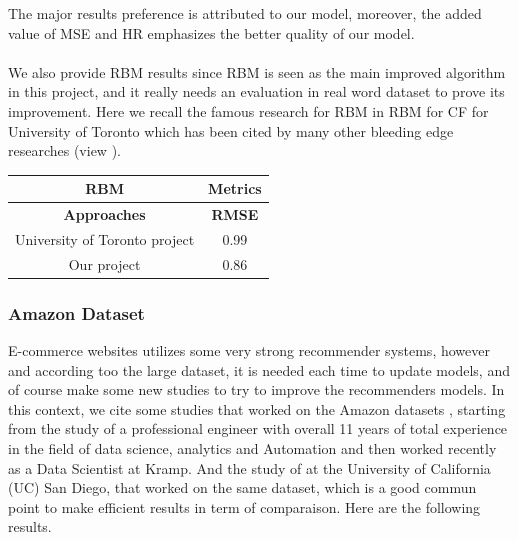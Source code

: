 \documentclass{cup-pan}
\begin{document}
The major results preference is attributed to our model, moreover, the added value of MSE and HR emphasizes the better quality of our model.
\paragraph{}
We also provide RBM results since RBM is seen as the main improved algorithm in this project, and it really needs an evaluation in real word dataset to prove its improvement. Here we recall the famous research for RBM in RBM for CF \cite{17} for University of Toronto which has been cited by many other bleeding edge researches (view \cite{17}).
\begin{center} 
  \begin{tabular}{||c||c||}
    \hline\hline
    \textbf{RBM} & \textbf{Metrics} \\
    \hline\hline
    \textbf{Approaches} & \textbf{RMSE} \\
    \hline
    University of Toronto project & 0.99 \\
    Our project & 0.86 \\
    \hline\hline
    \end{tabular}
\end{center}

\subsubsection{Amazon Dataset}
E-commerce websites utilizes some very strong recommender systems, however and according too the large dataset, it is needed each time to update models, and of course make some new studies to try to improve the recommenders models. In this context, we cite some studies that worked on the Amazon datasets \cite{18}, starting from the study of a professional engineer \cite{19} with overall 11 years of total experience in the field of data science, analytics and Automation and then worked recently as a Data Scientist at Kramp. And the study of \cite{20} at the University of California (UC) San Diego, that worked on the same dataset, which is a good commun point to make efficient results in term of comparaison. Here are the following results.
\end{document}
